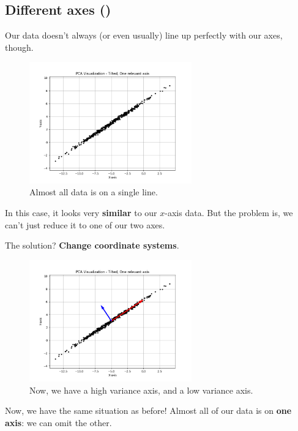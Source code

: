         \subsection{Different axes ()}

            Our data doesn't always (or even usually) line up perfectly with our axes, though.

            \begin{figure}[H]
                \centering
                \includegraphics[width=70mm,scale=0.5]{images/autoencoder_images/pca_tilt_axis.png}
                \caption*{Almost all data is on a single line.}
            \end{figure}

            In this case, it looks very \textbf{similar} to our $x$-axis data. But the problem is, we can't just reduce it to one of our two axes.

            The solution? \textbf{Change coordinate systems}.

            \begin{figure}[H]
                \centering
                \includegraphics[width=70mm,scale=0.5]{images/autoencoder_images/pca_tilt_axis_vec.png}
                \caption*{Now, we have a high variance axis, and a low variance axis.}
            \end{figure}

            Now, we have the same situation as before! Almost all of our data is on \textbf{one axis}: we can omit the other.\\

